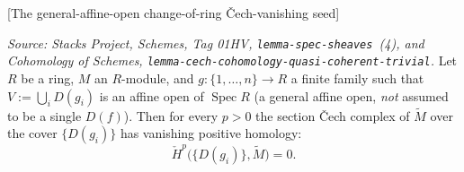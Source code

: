 \begin{lemma}

[The general-affine-open change-of-ring {\v C}ech-vanishing seed]
  \label{mk-lem:affine_cech_vanishing_general_seed}

  \textit{Source: Stacks Project, Schemes, Tag 01HV, \texttt{lemma-spec-sheaves}~(4), and
  Cohomology of Schemes, \texttt{lemma-cech-cohomology-quasi-coherent-trivial}.}
  Let \(R\) be a ring, \(M\) an \(R\)-module, and \(g : \{1, \dots, n\} \to R\) a finite family such that
  \(V := \bigcup_i D(g_i)\) is an affine open of \(\operatorname{Spec} R\) (a general affine open, \emph{not}
  assumed to be a single \(D(f)\)). Then for every \(p > 0\) the section {\v C}ech complex of
  \(\widetilde{M}\) over the cover \(\{D(g_i)\}\) has vanishing positive homology:
  \[
    \check{H}^p\bigl(\{D(g_i)\}, \widetilde{M}\bigr) = 0.
  \]
\end{lemma}
